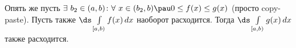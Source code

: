 
    Опять же пусть $\exists\  b_2\in(a,b)\colon \forall\  x\in(b_2,b)\pau 0\leq f(x)\leq g(x)$ (просто copy-paste).
    Пусть также $\ds\int\limits_{[a,b)}f(x)\,dx$ наоборот расходится. Тогда $\ds\int\limits_{[a,b)}g(x)\,dx$ также расходится. 
    